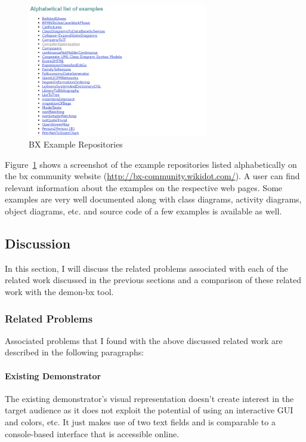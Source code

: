 \begin{figure}
	\includegraphics[width=0.7\textwidth]{figures/Bx_ExampleRepo}
	\caption{BX Example Repositories}
	\label{fig:Bx_ExampleRepo}
\end{figure}

Figure~\ref{fig:Bx_ExampleRepo} shows a screenshot of the example repositories listed alphabetically on the bx community website (\url{http://bx-community.wikidot.com/}). A user can find relevant information about the examples on the respective web pages. Some examples are very well documented along with class diagrams, activity diagrams, object diagrams, etc. and source code of a few examples is available as well.

\subsection{Discussion}\label{subsec:discussion}
In this section, I will discuss the related problems associated with each of the related work discussed in the previous sections and a comparison of these related work with the demon-bx tool.

\subsubsection{Related Problems}\label{subsubsec:relatedproblems}
Associated problems that I found with the above discussed related work are described in the following paragraphs: 

\paragraph{Existing Demonstrator}
The existing demonstrator's visual representation doesn't create interest in the target audience as it does not exploit the potential of using an interactive GUI and colors, etc. It just makes use of two text fields and is comparable to a console-based interface that is accessible online.

